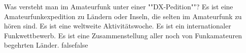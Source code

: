     {Was versteht man im Amateurfunk unter einer ""DX-Pedition""?}
    {Es ist eine Amateurfunkexpedition zu Ländern oder Inseln, die selten im Amateurfunk zu hören sind.}
    {Es ist eine weltweite Aktivitätswoche.}
    {Es ist ein internationaler Funkwettbewerb.}
    {Es ist eine Zusammenstellung aller noch von Funkamateuren begehrten Länder.}
    {false}{false}